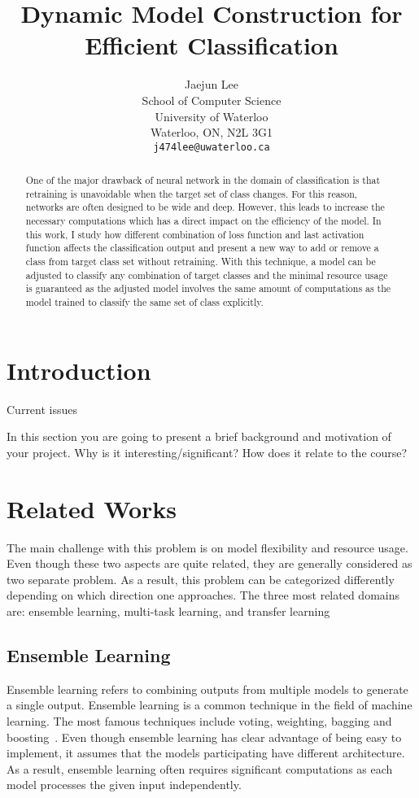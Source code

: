 \documentclass{article}
\title{Dynamic Model Construction for Efficient Classification}
\author{
	Jaejun Lee \\
	School of Computer Science\\
	University of Waterloo\\
	Waterloo, ON, N2L 3G1 \\
	\texttt{j474lee@uwaterloo.ca} \\
}
\begin{document}
\maketitle

\begin{abstract}

One of the major drawback of neural network in the domain of classification is that retraining is unavoidable when the target set of class changes. For this reason, networks are often designed to be wide and deep. However, this leads to increase the necessary computations which has a direct impact on the efficiency of the model. In this work, I study how different combination of loss function and last activation function affects the classification output and present a new way to add or remove a class from target class set without retraining. With this technique, a model can be adjusted to classify any combination of target classes and the minimal resource usage is guaranteed as the adjusted model involves the same amount of computations as the model trained to classify the same set of class explicitly.

\end{abstract}

\section{Introduction}

Current issues


In this section you are going to present a brief background and motivation of your project. Why is it interesting/significant? How does it relate to the course?

\section{Related Works}

The main challenge with this problem is on model flexibility and resource usage. Even though these two aspects are quite related, they are generally considered as two separate problem. As a result, this problem can be categorized differently depending on which direction one approaches. The three most related domains are: ensemble learning, multi-task learning, and transfer learning

\subsection{Ensemble Learning}
Ensemble learning refers to combining outputs from multiple models to generate a single output. Ensemble learning is a common technique in the field of machine learning. The most famous techniques include voting, weighting, bagging and boosting~\cite{dietterich2000ensemble, breiman1996bagging, freund1996experiments}. Even though ensemble learning has clear advantage of being easy to implement, it assumes that the models participating have different architecture. As a result, ensemble learning often requires significant computations as each model processes the given input independently.
\end{document}
